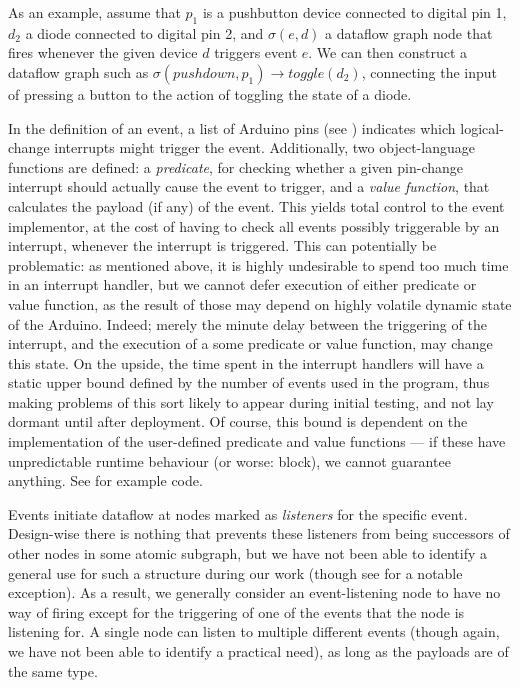 \documentclass[a4paper, oneside, final]{memoir}
\let\Fref\undefined
\begin{document}
As an example, assume that $p_1$ is a pushbutton device connected to
digital pin 1, $d_2$ a diode connected to digital pin 2, and $\sigma(e,d)$ a
dataflow graph node that fires whenever the given device $d$ triggers
event $e$.  We can then construct a dataflow graph such as
$\sigma(pushdown,p_1) \rightarrow toggle(d_2)$, connecting the input
of pressing a button to the action of toggling the state of a diode.

In the definition of an event, a list of Arduino pins (see \Fref{sec:pins})
indicates which logical-change interrupts might trigger the event.
Additionally, two object-language functions are defined: a
\textit{predicate}, for checking whether a given pin-change interrupt
should actually cause the event to trigger, and a
\textit{value function}, that calculates the payload (if any) of the
event.  This yields total control to the event implementor, at the
cost of having to check all events possibly triggerable by an
interrupt, whenever the interrupt is triggered.  This can potentially
be problematic: as mentioned above, it is highly undesirable to spend
too much time in an interrupt handler, but we cannot defer execution
of either predicate or value function, as the result of those may
depend on highly volatile dynamic state of the Arduino.  Indeed;
merely the minute delay between the triggering of the interrupt, and
the execution of a some predicate or value function, may change this
state.  On the upside, the time spent in the interrupt handlers will
have a static upper bound defined by the number of events used in the
program, thus making problems of this sort likely to appear during
initial testing, and not lay dormant until after deployment.  Of
course, this bound is dependent on the implementation of the
user-defined predicate and value functions --- if these have
unpredictable runtime behaviour (or worse: block), we cannot guarantee
anything.  See \Fref{sec:pushbuttondef} for example code.

Events initiate dataflow at nodes marked as \textit{listeners} for the
specific event.  Design-wise there is nothing that prevents these
listeners from being successors of other nodes in some atomic
subgraph, but we have not been able to identify a general use for such a
structure during our work (though see \Fref{sec:postingwireimpl} for a
notable exception).  As a result, we generally consider an
event-listening node to have no way of firing except for the
triggering of one of the events that the node is listening for.  A
single node can listen to multiple different events (though again, we
have not been able to identify a practical need), as long as the
payloads are of the same type.
\end{document}
